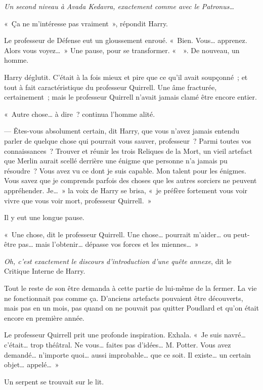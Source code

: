 {\emph{Un second niveau à Avada Kedavra, exactement comme avec le Patronus…}

«~Ça ne m'intéresse pas vraiment~», répondit Harry.

Le professeur de Défense eut un gloussement enroué.
«~Bien. Vous… apprenez.
Alors vous voyez…~»
Une pause, pour se transformer.
«~~».
De nouveau, un homme.

Harry déglutit.
C'était à la fois mieux et pire que ce qu'il avait soupçonné~; et tout à fait caractéristique du professeur Quirrell.
Une âme fracturée, certainement~; mais le professeur Quirrell n'avait jamais clamé être encore entier.

«~Autre chose… à dire~? continua l'homme alité.

--- Êtes-vous absolument certain, dit Harry, que vous n'avez jamais entendu parler de quelque chose qui pourrait vous sauver, professeur~?
Parmi toutes vos connaissances~?
Trouver et réunir les trois Reliques de la Mort, un vieil artefact que Merlin aurait scellé derrière une énigme que personne n'a jamais pu résoudre~?
Vous avez vu ce dont je suis capable.
Mon talent pour les énigmes.
Vous savez que je comprends parfois des choses que les autres sorciers ne peuvent appréhender.
Je…~» la voix de Harry se brisa, «~je préfère fortement vous voir vivre que vous voir mort, professeur Quirrell.~»

Il y eut une longue pause.

«~Une chose, dit le professeur Quirrell.
Une chose… pourrait m'aider… ou peut-être pas… mais l'obtenir… dépasse vos forces et les miennes…~»

\emph{Oh, c'est exactement le discours d'introduction d'une quête annexe}, dit le Critique Interne de Harry.

Tout le reste de son être demanda à cette partie de lui-même de la fermer.
La vie ne fonctionnait pas comme ça.
D'anciens artefacts pouvaient être découverts, mais pas en un mois, pas quand on ne pouvait pas quitter Poudlard et qu'on était encore en première année.

Le professeur Quirrell prit une profonde inspiration.
Exhala. «~Je suis navré… c'était… trop théâtral.
Ne vous… faites pas d'idées…
M. Potter.
Vous avez demandé… n'importe quoi… aussi improbable… que ce soit.
Il existe… un certain objet… appelé…~»

Un serpent se trouvait sur le lit.

}
